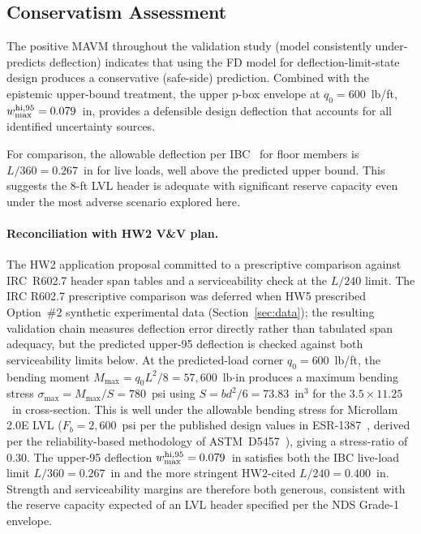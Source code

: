 \documentclass[10pt,twocolumn]{article}
\begin{document}
\subsection{Conservatism Assessment}
\label{sec:cons}

The positive MAVM throughout the validation study (model consistently
under-predicts deflection) indicates that using the FD model for
deflection-limit-state design produces a conservative (safe-side) prediction.
Combined with the epistemic upper-bound treatment, the upper p-box
envelope at $q_0=600$~lb/ft, $w_{\rm max}^{\rm hi,95} = 0.079$~in,
provides a defensible design deflection that accounts for all
identified uncertainty sources.

For comparison, the allowable deflection per IBC~\cite{ibc2021} for
floor members is $L/360 = 0.267$~in for live loads, well above the
predicted upper bound.
This suggests the 8-ft LVL header is adequate with significant reserve
capacity even under the most adverse scenario explored here.

\paragraph{Reconciliation with HW2 V\&V plan.}
The HW2 application proposal committed to a prescriptive comparison
against IRC~R602.7 header span tables and a serviceability check at the
$L/240$ limit.  The IRC R602.7 prescriptive comparison was deferred when
HW5 prescribed Option~\#2 synthetic experimental data
(Section~\ref{sec:data}); the resulting validation chain measures
deflection error directly rather than tabulated span adequacy, but the
predicted upper-95 deflection is checked against both serviceability
limits below.
At the predicted-load corner $q_0=600$~lb/ft, the bending moment
$M_{\max}=q_0L^2/8=57{,}600$~lb$\cdot$in produces a maximum bending
stress $\sigma_{\max}=M_{\max}/S=780$~psi using $S=bd^2/6=73.83$~in$^3$
for the $3.5\!\times\!11.25$~in cross-section.  This is well under the
allowable bending stress for Microllam 2.0E LVL
($F_b=2{,}600$~psi per the published design values in
ESR-1387~\cite{esr1387}, derived per the reliability-based methodology
of ASTM~D5457~\cite{astmD5457}), giving a stress-ratio of $0.30$.
The upper-95 deflection $w_{\rm max}^{\rm hi,95}=0.079$~in satisfies both
the IBC live-load limit $L/360=0.267$~in and the more stringent HW2-cited
$L/240=0.400$~in.  Strength and serviceability margins are therefore both
generous, consistent with the reserve capacity expected of an LVL header
specified per the NDS Grade-1 envelope.
\end{document}
